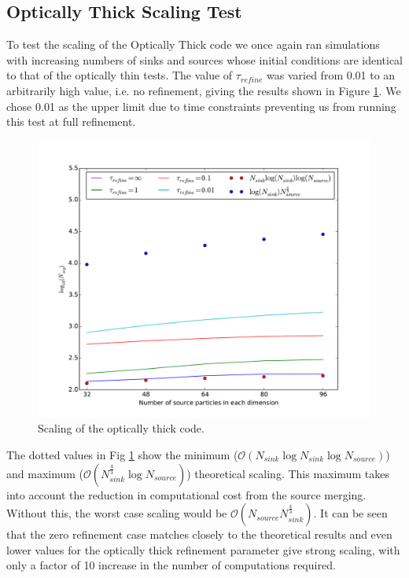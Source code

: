 \subsection{Optically Thick Scaling Test}
To test the scaling of the Optically Thick code we once again ran simulations with increasing numbers of sinks and sources whose initial conditions are identical to that of the optically thin tests. The value of $\tau_{refine}$ was varied from 0.01 to an arbitrarily high value, i.e. no refinement, giving the results shown in Figure \ref{fig:scalingThick}. We chose 0.01 as the upper limit due to time constraints preventing us from running this test at full refinement.
\begin{figure} [H]
    \centering
    \includegraphics[width=\textwidth]{plots/CH4/tau_scaling.pdf}
    \caption{Scaling of the optically thick code.}
    \label{fig:scalingThick}
\end{figure}
The dotted values in Fig \ref{fig:scalingThick} show the minimum ($\mathcal{O}(N_{sink}\log{N_{sink}}\log{N_{source}})$) and maximum ($\mathcal{O}(N_{sink}^{\frac{4}{3}}\log{N_{source}})$) theoretical scaling. This maximum takes into account the reduction in computational cost from the source merging. Without this, the worst case scaling would be $\mathcal{O}(N_{source}N_{sink}^{\frac{4}{3}})$. It can be seen that the zero refinement case matches closely to the theoretical results and even lower values for the optically thick refinement parameter give strong scaling, with only a factor of 10 increase in the number of computations required.

